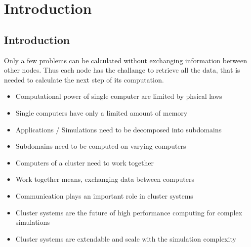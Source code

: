 \chapter{Introduction}
\label{sec:intro}



\section{Introduction}

Only a few problems can be calculated without exchanging information
between other nodes. Thus each node has the challange to retrieve all
the data, that is needed to calculate the next step of its
computation.

\begin{itemize}
\item Computational power of single computer are limited by phsical
  laws
\item Single computers have only a limited amount of memory
\item Applications / Simulations need to be decomposed into subdomains
\item Subdomains need to be computed on varying computers
\item Computers of a cluster need to work together
\item Work together means, exchanging data between computers
\item Communication plays an important role in cluster systems
\item Cluster systems are the future of high performance computing for complex simulations
\item Cluster systems are extendable and scale with the simulation complexity
\end{itemize}


\cleardoublepage

